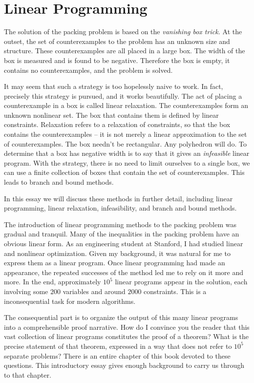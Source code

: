 \clearpage
\section{Linear Programming}

The solution of the packing problem is based on the {\it vanishing
box trick.}  At the outset, the set of 
counterexamples to the problem has an unknown size and structure.
These counterexamples are all placed in a large box.   
The width of the box is measured and is found to be negative.
Therefore the box is empty, it contains no counterexamples, and
the problem is solved.

It may seem that such a strategy is too hopelessly naive to work.
In fact, precisely this strategy is pursued, and it works beautifully.
The act of placing a counterexample in a box is called linear 
relaxation.  The counterexamples form an unknown nonlinear set.
The box that contains them is defined by linear constraints.  
Relaxation refers to a relaxation of constraints, so that the
box contains the counterexamples -- it is not merely a linear
approximation to the set of counterexamples.  The box needn't be
rectangular.  Any polyhedron will do.  To determine that a box
has negative width is to say that it gives an {\it infeasible} linear
program.  With the strategy, there is no need to limit ourselves
to a single box, we can use a finite collection of boxes that
contain the set of counterexamples.  This leads to branch and bound
methods.


In this essay we will discuss these methods in further detail,
including linear programming, linear relaxation,  infeasibility,
and branch and bound methods.

The introduction of linear programming methods to the packing
problem was gradual and tranquil.  
Many of the
inequalities in the packing problem have an obvious linear form.
As an engineering student
at Stanford, I had studied
linear and nonlinear optimization.
Given my background, 
it was natural for me to express them as a linear program.  
Once linear programming had made an appearance, the 
repeated successes of the method led me to rely on it more and more.
In the end, approximately $10^5$ linear programs appear in the solution,
each involving some $200$ variables and around $2000$ constraints.
This is a inconsequential task for modern algorithms.  

The consequential
part is to organize the output of this many 
linear programs into a comprehensible proof narrative.  How do I convince
you the reader that this vast collection of linear programs 
constitutes the proof of a theorem?  
What is the precise statement
of that theorem, expressed in a way that does not refer to $10^5$ separate
problems? There is an entire chapter of this book devoted to these questions.
This introductory essay gives enough background to carry us through
to that chapter.


